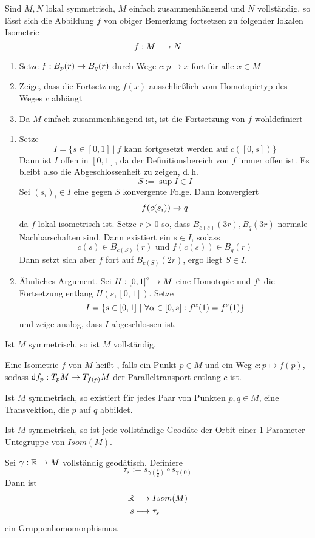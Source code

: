 \documentclass{book}
\renewcommand{\d}{\textsf{d}}
\begin{document}
\Lem{}
Sind $M, N$ lokal symmetrisch, $M$ einfach zusammenhängend und $N$ vollständig, so lässt sich die Abbildung $f$ von obiger Bemerkung fortsetzen zu folgender lokalen Isometrie
\[ f : M \overset{}{\longrightarrow} N \]
\begin{Beweis}{}
\begin{enumerate}[1.)]
\item Setze $f : B_p(r) \overset{}{\rightarrow} B_q(r) $ durch Wege $c : p \mapsto x$ fort für alle $x \in M$
\item Zeige, dass die Fortsetzung $f(x)$ ausschließlich vom Homotopietyp des Weges $c$ abhängt
\item Da $M$ einfach zusammenhängend ist, ist die Fortsetzung von $f$ wohldefiniert 
\end{enumerate}
\begin{enumerate}[\text{Ad} 1.)]
\item Setze
\[I = \{ s \in [0,1] ~|~ f \text{ kann fortgesetzt werden auf }c([0,s]) \}\]
Dann ist $I$ offen in $[0,1]$, da der Definitionsbereich von $f$ immer offen ist. Es bleibt also die Abgeschlossenheit zu zeigen, d.\,h.
\[ S:= \sup I \in I \]
Sei $(s_i)_i \in I$ eine gegen $S$ konvergente Folge. Dann konvergiert
\[ f(c(s_i)) \overset{}{\rightarrow} q \]
da $f$ lokal isometrisch ist. Setze $r > 0$ so, dass $B_{c(s)}(3r), B_{q}(3r)$ normale Nachbarschaften sind. Dann existiert ein $s \in I$, sodass
\[ c(s) \in B_{c(S)}(r) \text{ und } f(c(s)) \in B_q(r) \]
Dann setzt sich aber $f$ fort auf $B_{c(S)}(2r)$, ergo liegt $S \in I$.
\item Ähnliches Argument. Sei $H : [0,1]^2 \overset{}{\rightarrow} M$ eine Homotopie und $f^s$ die Fortsetzung entlang $H(s,[0,1])$. Setze
\[ I = \set{s \in [0,1]}{ \forall\alpha \in [0,s]: f^\alpha (1) = f^s(1) } \]
und zeige analog, dass $I$ abgeschlossen ist.
\end{enumerate}
\end{Beweis}

\Prop{}
Ist $M$ symmetrisch, so ist $M$ vollständig.

\Def{}
Eine Isometrie $f$ von $M$ heißt , falls ein Punkt $p \in M$ und ein Weg $c : p \mapsto f(p)$, sodass $\d f_p : T_pM \pfeil{} T_{f(p)}M$ der Paralleltransport entlang $c$ ist.

\Prop{}
Ist $M$ symmetrisch, so existiert für jedes Paar von Punkten $p,q \in M$, eine Transvektion, die $p$ auf $q$ abbildet.

\Kor{}
Ist $M$ symmetrisch, so ist jede vollständige Geodäte der Orbit einer 1-Parameter Untegruppe von $Isom(M)$.
\begin{Beweis}{}
Sei $\gamma : \mathbb{R} \overset{}{\rightarrow} M$ vollständig geodätisch. Definiere
\[ \tau_s := s_{\gamma(\frac{s}{2})} \circ s_{\gamma(0)} \]
Dann ist
\begin{align*}
\mathbb{R} &\overset{}{\longrightarrow} Isom(M)\\
s & \longmapsto \tau_s
\end{align*}
ein Gruppenhomomorphismus.
\end{Beweis}
\end{document}
